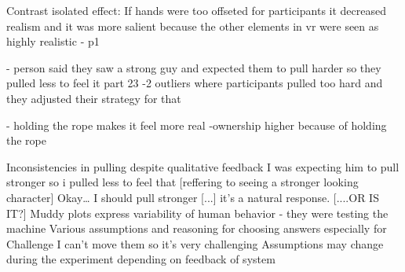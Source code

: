 Contrast isolated effect: If hands were too offseted for participants it decreased realism and it was more salient because the other elements in vr were seen as highly realistic - p1 

- person said they saw a strong guy and expected them to pull harder so they pulled less to feel it part 23 
-2 outliers where participants pulled too hard and they adjusted their strategy for that 



- holding the rope makes it feel more real
-ownership higher because of holding the rope


Inconsistencies in pulling despite qualitative feedback
I was expecting him to pull stronger so i pulled less to feel that
[reffering to seeing a stronger looking character] Okay… I should pull stronger  [...] it’s a natural response. [....OR IS  IT?]
Muddy plots express variability of human behavior - they were testing the machine
Various assumptions and reasoning for choosing answers especially for Challenge
I can't move them so it’s very challenging
Assumptions may change during the experiment depending on feedback of system

